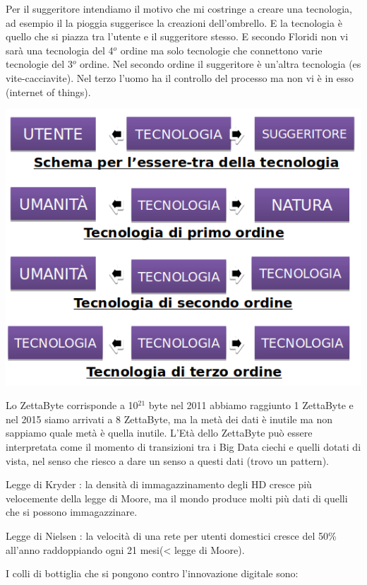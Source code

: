 \documentclass[a4page, 11pt]{article}
\begin{document}
Per il suggeritore intendiamo il motivo che mi costringe a creare una
tecnologia, ad esempio il la pioggia suggerisce la creazioni
dell'ombrello. E la tecnologia è quello che si piazza tra l'utente e il
suggeritore stesso. E secondo Floridi non vi sarà una tecnologia del 4$^o$
ordine ma solo tecnologie che connettono varie tecnologie del 3$^o$ ordine.
Nel secondo ordine il suggeritore è un'altra tecnologia (es vite-cacciavite).
Nel terzo l'uomo ha il controllo del processo ma non vi è in esso (internet
of things).
\begin{center}
	\includegraphics[scale=0.6]{image2.png}
\end{center}


Lo ZettaByte corrisponde a 10$^{21}$ byte nel 2011 abbiamo raggiunto 1
ZettaByte e nel 2015 siamo arrivati a 8 ZettaByte, ma la metà dei dati è
inutile ma non sappiamo quale metà è quella inutile. L'Età dello
ZettaByte può essere interpretata come il momento di transizioni tra i
Big Data ciechi e quelli dotati di vista, nel senso che riesco a dare un
senso a questi dati (trovo un pattern).

Legge di Kryder : la densità di immagazzinamento degli HD cresce più
velocemente della legge di Moore, ma il mondo produce molti più dati di
quelli che si possono immagazzinare.

Legge di Nielsen : la velocità di una rete per utenti domestici cresce
del 50\% all'anno raddoppiando ogni 21 mesi(\textless{} legge di Moore).

I colli di bottiglia che si pongono contro l'innovazione digitale sono:
\end{document}
